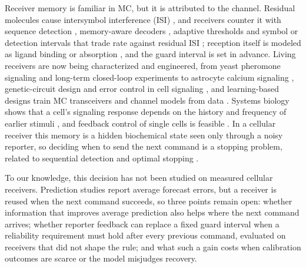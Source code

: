 \documentclass[conference]{IEEEtran}
\begin{document}
Receiver memory is familiar in MC, but it is attributed to the channel. Residual molecules cause intersymbol interference (ISI) \cite{farsad2016,jamali2019}, and receivers counter it with sequence detection \cite{kilinc2013}, memory-aware decoders \cite{mosayebi2014}, adaptive thresholds \cite{damrath2016} and symbol or detection intervals that trade rate against residual ISI \cite{tepekule2015,cao2020}; reception itself is modeled as ligand binding or absorption \cite{pierobon2011}, and the guard interval is set in advance. Living receivers are now being characterized and engineered, from yeast pheromone signaling \cite{ntetsikas2025} and long-term closed-loop experiments \cite{scherer2025} to astrocyte calcium signaling \cite{barros2020}, genetic-circuit design \cite{durmaz2024} and error control in cell signaling \cite{borges2024}, and learning-based designs train MC transceivers and channel models from data \cite{cheng2024,cai2025,dong2026}. Systems biology shows that a cell's signaling response depends on the history and frequency of earlier stimuli \cite{blum2019,ryu2015}, and feedback control of single cells is feasible \cite{postiglione2018,lugagne2024}. In a cellular receiver this memory is a hidden biochemical state seen only through a noisy reporter, so deciding when to send the next command is a stopping problem, related to sequential detection \cite{wald1945,tung2019} and optimal stopping \cite{poor2009}.

To our knowledge, this decision has not been studied on measured cellular receivers. Prediction studies report average forecast errors, but a receiver is reused when the next command succeeds, so three points remain open: whether information that improves average prediction also helps where the next command arrives; whether reporter feedback can replace a fixed guard interval when a reliability requirement must hold after every previous command, evaluated on receivers that did not shape the rule; and what such a gain costs when calibration outcomes are scarce or the model misjudges recovery.
\end{document}
